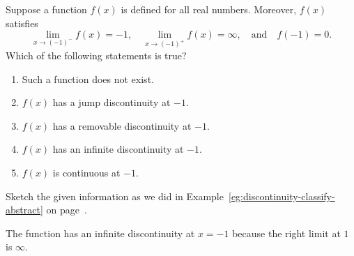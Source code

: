 \documentclass[../main.tex]{subfiles}
\begin{document}
\begin{exercise}
  Suppose a function \(f(x)\) is defined for all real numbers. Moreover, \(f(x)\) satisfies
  \[
    \lim_{x \to (-1)^{-}} f(x) = -1,
    \quad
    \lim_{x \to (-1)^{+}} f(x) = \infty,
    \quad\text{and}\quad
    f(-1) = 0.
  \]
  Which of the following statements is true?

  \begin{enumerate}[label=\Alph*.]
    \item Such a function does not exist.
    \item \(f(x)\) has a jump discontinuity at \(-1\).
    \item \(f(x)\) has a removable discontinuity at \(-1\).
    \item \(f(x)\) has an infinite discontinuity at \(-1\).
    \item \(f(x)\) is continuous at \(-1\).
  \end{enumerate}

  \begin{hint}
    Sketch the given information as we did in Example~\ref{eg:discontinuity-classify-abstract} on page~\pageref{eg:discontinuity-classify-abstract}.
  \end{hint}
  \begin{solution}
    The function has an infinite discontinuity at \(x = -1\) because the right limit at \(1\) is \(\infty\).
  \end{solution}
\end{exercise}



\nopagebreak\vfill
\end{document}
